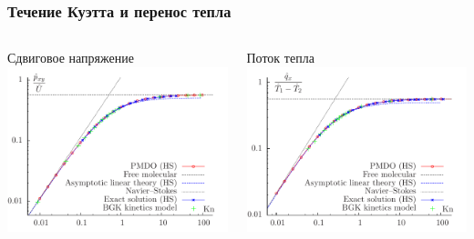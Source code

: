 \documentclass[ucs]{beamer}
\begin{document}
\begin{frame}
	\frametitle{Течение Куэтта и перенос тепла}
	\begin{columns}
		\begin{center}
			Сдвиговое напряжение\\
			\includegraphics[width=\textwidth]{pics/couette_stress}
		\end{center}
		\begin{center}
			Поток тепла\\
			\includegraphics[width=\textwidth]{pics/heat_qflow}
		\end{center}
	\end{columns}
\end{frame}
\end{document}
